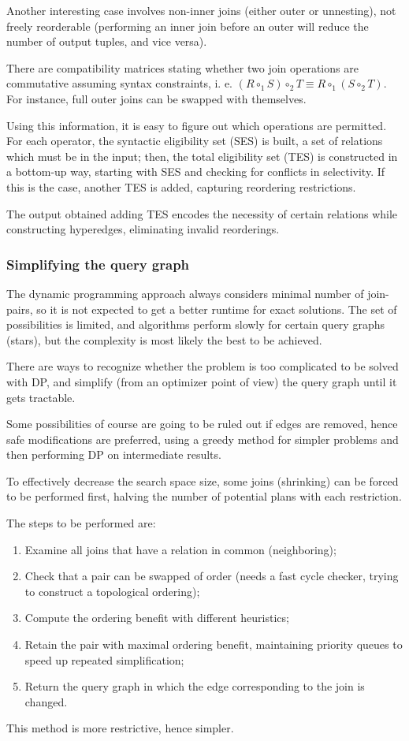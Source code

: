 Another interesting case involves non-inner joins (either outer or unnesting), not freely reorderable (performing an inner join before an outer will reduce the number of output tuples, and vice versa). 

There are compatibility matrices stating whether two join operations are commutative assuming syntax constraints, i. e. $(R \circ_1 S) \circ_2 T \equiv R \circ_1 (S \circ_2 T)$. For instance, full outer joins can be swapped with themselves. 

Using this information, it is easy to figure out which operations are permitted. For each operator, the syntactic eligibility set (SES) is built, a set of relations which must be in the input; then, the total eligibility set (TES) is constructed in a bottom-up way, starting with SES and checking for conflicts in selectivity. If this is the case, another TES is added, capturing reordering restrictions. 

The output obtained adding TES encodes the necessity of certain relations while constructing hyperedges, eliminating invalid reorderings.

\subsubsection{Simplifying the query graph}
The dynamic programming approach always considers minimal number of join-pairs, so it is not expected to get a better runtime for exact solutions. The set of possibilities is limited, and algorithms perform slowly for certain query graphs (stars), but the complexity is most likely the best to be achieved.

There are ways to recognize whether the problem is too complicated to be solved with DP, and simplify (from an optimizer point of view) the query graph until it gets tractable. 

Some possibilities of course are going to be ruled out if edges are removed, hence safe modifications are preferred, using a greedy method for simpler problems and then performing DP on intermediate results. 

To effectively decrease the search space size, some joins (shrinking) can be forced to be performed first, halving the number of potential plans with each restriction. 

The steps to be performed are:
\begin{enumerate}
	\item Examine all joins that have a relation in common (neighboring);
	\item Check that a pair can be swapped of order (needs a fast cycle checker, trying to construct a topological ordering);
	\item Compute the ordering benefit with different heuristics;
	\item Retain the pair with maximal ordering benefit, maintaining priority queues to speed up repeated simplification;
	\item Return the query graph in which the edge corresponding to the join is changed.
\end{enumerate}
This method is more restrictive, hence simpler. 

